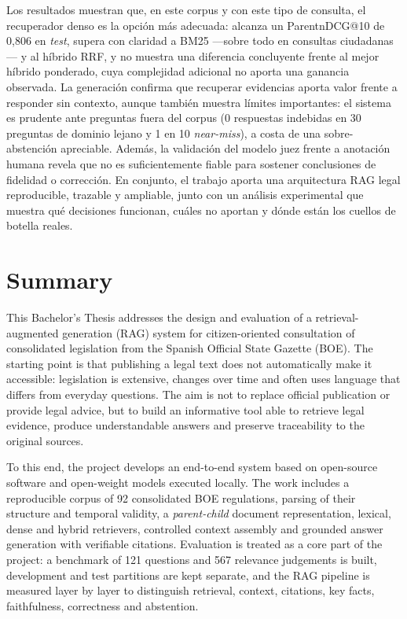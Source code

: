 \documentclass[
paper=a4,
fontsize=12pt,
twoside,
openright,                  %
titlepage,                  %
headsepline,                %
footheight=16pt,            %
parskip=half+,				%
numbers=noenddot,			%
headinclude=true,           %
footinclude=true,           %
cleardoublepage=empty,      %
captions=tableheading,      %
BCOR=5mm, 				    %
DIV=9   			        %
usegeometry=true			%
]{scrbook}
\begin{document}
Los resultados muestran que, en este corpus y con este tipo de consulta, el recuperador denso es la opción más adecuada: alcanza un ParentnDCG@10 de 0,806 en \emph{test}, supera con claridad a BM25 —sobre todo en consultas ciudadanas— y al híbrido RRF, y no muestra una diferencia concluyente frente al mejor híbrido ponderado, cuya complejidad adicional no aporta una ganancia observada. La generación confirma que recuperar evidencias aporta valor frente a responder sin contexto, aunque también muestra límites importantes: el sistema es prudente ante preguntas fuera del corpus (0 respuestas indebidas en 30 preguntas de dominio lejano y 1 en 10 \emph{near-miss}), a costa de una sobre-abstención apreciable. Además, la validación del modelo juez frente a anotación humana revela que no es suficientemente fiable para sostener conclusiones de fidelidad o corrección. En conjunto, el trabajo aporta una arquitectura RAG legal reproducible, trazable y ampliable, junto con un análisis experimental que muestra qué decisiones funcionan, cuáles no aportan y dónde están los cuellos de botella reales.


\chapter*{Summary}

This Bachelor's Thesis addresses the design and evaluation of a retrieval-augmented generation (RAG) system for citizen-oriented consultation of consolidated legislation from the Spanish Official State Gazette (BOE). The starting point is that publishing a legal text does not automatically make it accessible: legislation is extensive, changes over time and often uses language that differs from everyday questions. The aim is not to replace official publication or provide legal advice, but to build an informative tool able to retrieve legal evidence, produce understandable answers and preserve traceability to the original sources.

To this end, the project develops an end-to-end system based on open-source software and open-weight models executed locally. The work includes a reproducible corpus of 92 consolidated BOE regulations, parsing of their structure and temporal validity, a \emph{parent-child} document representation, lexical, dense and hybrid retrievers, controlled context assembly and grounded answer generation with verifiable citations. Evaluation is treated as a core part of the project: a benchmark of 121 questions and 567 relevance judgements is built, development and test partitions are kept separate, and the RAG pipeline is measured layer by layer to distinguish retrieval, context, citations, key facts, faithfulness, correctness and abstention.
\end{document}
